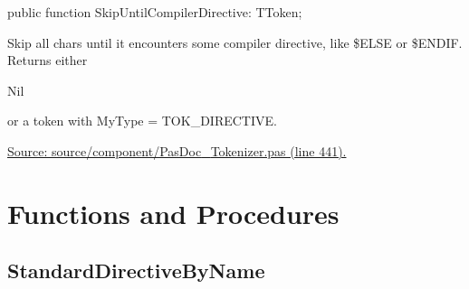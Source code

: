 \documentclass{report}
\newif\ifpdf
\begin{document}
\label{PasDoc_Tokenizer.TTokenizer-SkipUntilCompilerDirective}
\begin{list}{}{
\setlength{\itemindent}{0cm}
\setlength{\listparindent}{0cm}
\setlength{\leftmargin}{\evensidemargin}
\addtolength{\leftmargin}{\tmplength}
\settowidth{\labelsep}{X}
\addtolength{\leftmargin}{\labelsep}
\setlength{\labelwidth}{\tmplength}
}
\item[\textbf{Declaration}\hfill]
\ifpdf
\begin{flushleft}
\fi
\begin{ttfamily}
public function SkipUntilCompilerDirective: TToken;\end{ttfamily}

\ifpdf
\end{flushleft}
\fi

\par
\item[\textbf{Description}]
Skip all chars until it encounters some compiler directive, like {\$}ELSE or {\$}ENDIF. Returns either \begin{ttfamily}Nil\end{ttfamily} or a token with MyType = TOK{\_}DIRECTIVE.\par
\href{https://github.com/pasdoc/pasdoc/blob/master/source/component/PasDoc_Tokenizer.pas#L441}{Source: source/component/PasDoc{\_}Tokenizer.pas (line 441).}

\end{list}
\section{Functions and Procedures}
\ifpdf
\subsection*{\large{\textbf{StandardDirectiveByName}}\normalsize\hspace{1ex}\hrulefill}
\else
\end{document}

